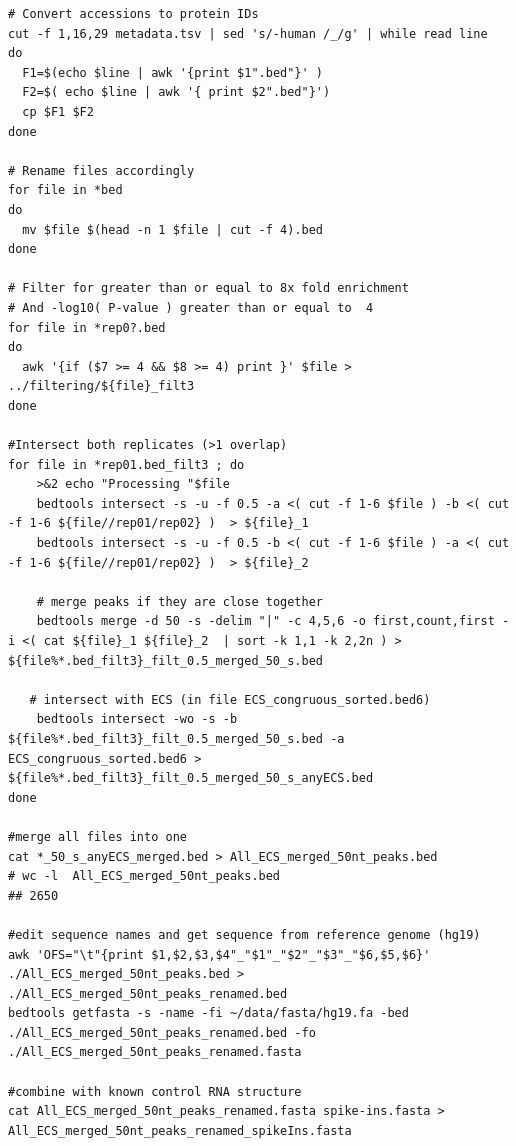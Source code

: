 \documentclass{bmcart}
\begin{document}
\begin{lstlisting}
# Convert accessions to protein IDs
cut -f 1,16,29 metadata.tsv | sed 's/-human /_/g' | while read line 
do 
  F1=$(echo $line | awk '{print $1".bed"}' ) 
  F2=$( echo $line | awk '{ print $2".bed"}') 
  cp $F1 $F2 
done 

# Rename files accordingly
for file in *bed
do 
  mv $file $(head -n 1 $file | cut -f 4).bed
done

# Filter for greater than or equal to 8x fold enrichment
# And -log10( P-value ) greater than or equal to  4
for file in *rep0?.bed 
do
  awk '{if ($7 >= 4 && $8 >= 4) print }' $file > ../filtering/${file}_filt3
done

#Intersect both replicates (>1 overlap) 
for file in *rep01.bed_filt3 ; do     
    >&2 echo "Processing "$file
    bedtools intersect -s -u -f 0.5 -a <( cut -f 1-6 $file ) -b <( cut -f 1-6 ${file//rep01/rep02} )  > ${file}_1
    bedtools intersect -s -u -f 0.5 -b <( cut -f 1-6 $file ) -a <( cut -f 1-6 ${file//rep01/rep02} )  > ${file}_2
    
    # merge peaks if they are close together
    bedtools merge -d 50 -s -delim "|" -c 4,5,6 -o first,count,first -i <( cat ${file}_1 ${file}_2  | sort -k 1,1 -k 2,2n ) > ${file%*.bed_filt3}_filt_0.5_merged_50_s.bed
    
   # intersect with ECS (in file ECS_congruous_sorted.bed6) 
    bedtools intersect -wo -s -b ${file%*.bed_filt3}_filt_0.5_merged_50_s.bed -a ECS_congruous_sorted.bed6 > ${file%*.bed_filt3}_filt_0.5_merged_50_s_anyECS.bed
done

#merge all files into one
cat *_50_s_anyECS_merged.bed > All_ECS_merged_50nt_peaks.bed
# wc -l  All_ECS_merged_50nt_peaks.bed
## 2650

#edit sequence names and get sequence from reference genome (hg19) 
awk 'OFS="\t"{print $1,$2,$3,$4"_"$1"_"$2"_"$3"_"$6,$5,$6}'  ./All_ECS_merged_50nt_peaks.bed > ./All_ECS_merged_50nt_peaks_renamed.bed
bedtools getfasta -s -name -fi ~/data/fasta/hg19.fa -bed ./All_ECS_merged_50nt_peaks_renamed.bed -fo ./All_ECS_merged_50nt_peaks_renamed.fasta

#combine with known control RNA structure
cat All_ECS_merged_50nt_peaks_renamed.fasta spike-ins.fasta > All_ECS_merged_50nt_peaks_renamed_spikeIns.fasta
\end{lstlisting}
\end{document}
